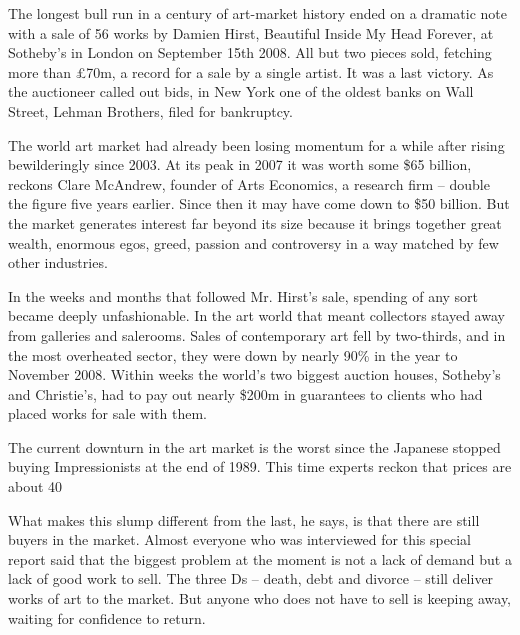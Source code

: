 The longest bull run in a century of art-market history ended on a dramatic note with a sale of 56 works by Damien Hirst, Beautiful Inside My Head Forever, at Sotheby's in London on September 15th 2008. All but two pieces sold, fetching more than £70m, a record for a sale by a single artist. It was a last victory. As the auctioneer called out bids, in New York one of the oldest banks on Wall Street, Lehman Brothers, filed for bankruptcy.


The world art market had already been losing momentum for a while after rising bewilderingly since 2003. At its peak in 2007 it was worth some \$65 billion, reckons Clare McAndrew, founder of Arts Economics, a research firm – double the figure five years earlier. Since then it may have come down to \$50 billion. But the market generates interest far beyond its size because it brings together great wealth, enormous egos, greed, passion and controversy in a way matched by few other industries.


In the weeks and months that followed Mr. Hirst's sale, spending of any sort became deeply unfashionable. In the art world that meant collectors stayed away from galleries and salerooms. Sales of contemporary art fell by two-thirds, and in the most overheated sector, they were down by nearly 90\% in the year to November 2008. Within weeks the world's two biggest auction houses, Sotheby's and Christie's, had to pay out nearly \$200m in guarantees to clients who had placed works for sale with them.


The current downturn in the art market is the worst since the Japanese stopped buying Impressionists at the end of 1989. This time experts reckon that prices are about 40%


What makes this slump different from the last, he says, is that there are still buyers in the market. Almost everyone who was interviewed for this special report said that the biggest problem at the moment is not a lack of demand but a lack of good work to sell. The three Ds – death, debt and divorce – still deliver works of art to the market. But anyone who does not have to sell is keeping away, waiting for confidence to return.